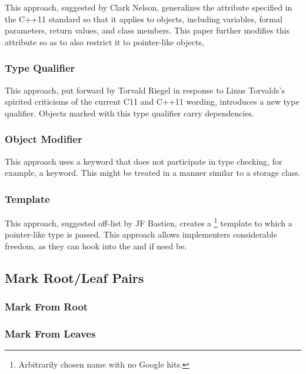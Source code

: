 \documentclass[letterpaper,twocolumn,10pt]{article}
\begin{document}
This approach, suggested by Clark Nelson, generalizes the
 attribute specified in the C++11 standard
so that it applies to objects, including variables, formal parameters,
return values, and class members.
This paper further modifies this attribute so as to also restrict
it to pointer-like objects,

\subsubsection{Type Qualifier}
\label{sec:Type Qualifier}

This approach, put forward by Torvald Riegel in response to
Linus Torvalds's spirited criticisms of the current C11 and C++11
wording, introduces a new  type qualifier.
Objects marked with this type qualifier carry dependencies.

\subsubsection{Object Modifier}
\label{sec:Object Modifier}

This approach uses a keyword that does not participate in type checking,
for example, a  keyword.
This might be treated in a manner similar to a storage class.

\subsubsection{Template}
\label{sec:Template}

This approach, suggested off-list by JF Bastien, creates a
\footnote{
	Arbitrarily chosen name with no Google hits.}
template to which a pointer-like type is passed.
This approach allows implementers considerable freedom, as they can
hook into the \co{->} and \co{*} if need be.

\subsection{Mark Root/Leaf Pairs}
\label{sec:Mark Root/Leaf Pairs}

\subsubsection{Mark From Root}
\label{sec:Mark From Root}

\subsubsection{Mark From Leaves}
\label{sec:Mark From Leaves}
\end{document}
